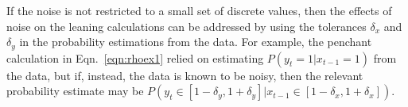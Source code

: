 \documentclass[twocolumn,aps,pre,groupedaddress]{revtex4-1}
\begin{document}
If the noise is not restricted to a small set of discrete values, then the effects of noise on the leaning calculations can be addressed by using the tolerances $\delta_x$ and $\delta_y$ in the probability estimations from the data.  For example, the penchant calculation in Eqn.\ \ref{eqn:rhoex1} relied on estimating $P(y_t=1|x_{t-1}=1)$ from the data, but if, instead, the data is known to be noisy, then the relevant probability estimate may be $P(y_t\in[1-\delta_y,1+\delta_y]|x_{t-1}\in[1-\delta_x,1+\delta_x])$.  


\end{document}
